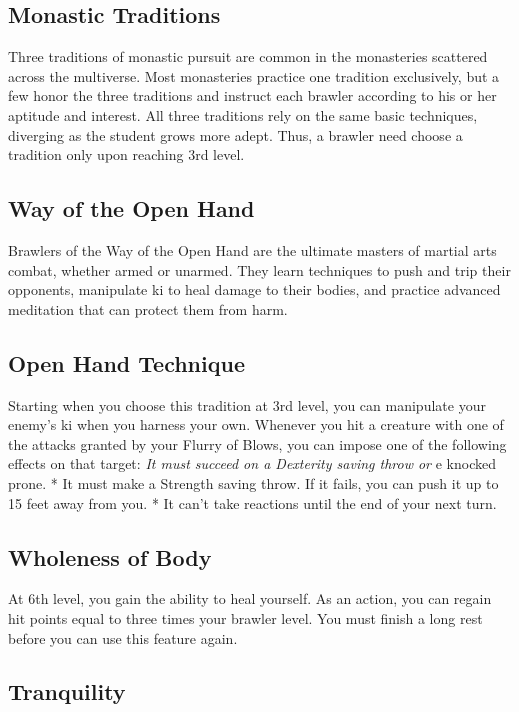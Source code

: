 \subsection{Monastic Traditions}

Three traditions of monastic pursuit are common in the monasteries scattered across the multiverse. Most monasteries practice one tradition exclusively, but a few honor the three traditions and instruct each brawler according to his or her aptitude and interest. All three traditions rely on the same basic techniques, diverging as the student grows more adept. Thus, a brawler need choose a tradition only upon reaching 3rd level.

\subsection{Way of the Open Hand}

Brawlers of the Way of the Open Hand are the ultimate masters of martial arts combat, whether armed or unarmed. They learn techniques to push and trip their opponents, manipulate ki to heal damage to their bodies, and practice advanced meditation that can protect them from harm.

\subsection{Open Hand Technique}

Starting when you choose this tradition at 3rd level, you can manipulate your enemy’s ki when you harness your own. Whenever you hit a creature with one of the attacks granted by your Flurry of Blows, you can impose one of the following effects on that target:
\textit{ It must succeed on a Dexterity saving throw or }e knocked prone.
* It must make a Strength saving throw. If it fails, you can push it up to 15 feet away from you.
* It can’t take reactions until the end of your next turn.

\subsection{Wholeness of Body}

At 6th level, you gain the ability to heal yourself. As an action, you can regain hit points equal to three times your brawler level. You must finish a long rest before you can use this feature again.

\subsection{Tranquility}

